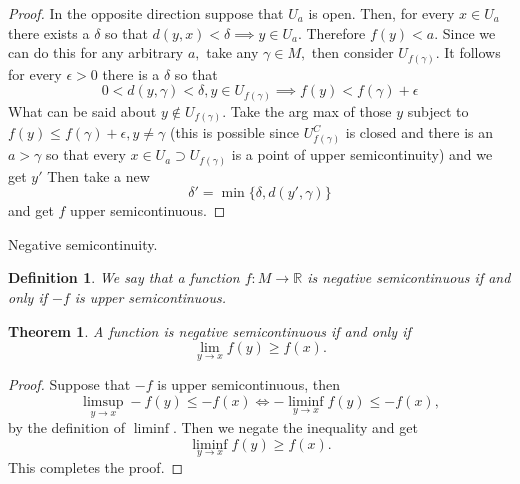 \documentclass[letter]{article}
\newtheorem{theorem}{Theorem}
\newtheorem{definition}{Definition}
\newenvironment{menumerate}{%
  \edef\backupindent{\the\parindent}%
  \enumerate%
  \setlength{\parindent}{\backupindent}%
}{\endenumerate}
\begin{document}
\begin{menumerate}
\begin{menumerate}
\begin{proof}
         In the opposite direction suppose that $U_a$ is open.
         Then, for every $x \in U_a$ there exists a $\delta$ so that
         $d(y,x) < \delta \implies y \in U_a. $ Therefore $f(y) < a.$
         Since we can do this for any arbitrary $a,$ take any $\gamma \in M,$ then consider $U_{f(\gamma)}.$ It follows for every $\epsilon > 0$ there is a $\delta$ so that
         \begin{equation}
            0 < d(y, \gamma) < \delta, y \in U_{f(\gamma)} \implies f(y) < f(\gamma) + \epsilon
         \end{equation}
         What can be said about $y \notin U_{f(\gamma)}.$ Take the arg max of
         those $y$ subject to $f(y) \leq f(\gamma)  + \epsilon, y \neq \gamma$ (this is possible since $U_{f(\gamma)}^C$ is closed and there is an $a > \gamma$ so that every $x \in U_a \supset U_{f(\gamma)}$ is a point of upper semicontinuity) and we get $y'$ Then take a new 
         \begin{equation}
            \delta' = \min\{\delta, d(y',\gamma)\}
         \end{equation}
         and get $f$ upper semicontinuous.
    \end{proof}
    \item Negative semicontinuity.
    \begin{definition}
        We say that a function $f: M \to \mathbb{R}$ is negative semicontinuous if and only if $-f$ is upper semicontinuous.   
    \end{definition}
    \begin{theorem}
        A function is negative semicontinuous if and only if 
        \begin{equation}
            \lim_{y \to x} f(y) \geq f(x).    
        \end{equation}   
    \end{theorem}
    \begin{proof}
        Suppose that $-f$ is upper semicontinuous, then
        \begin{equation}
            \limsup_{y \to x} -f(y) \leq -f(x) \iff
            -\liminf_{y \to x} f(y) \leq -f(x),   
        \end{equation}   
        by the definition of $\liminf.$ Then we negate the inequality and get 
        \begin{equation}
            \liminf_{y\to x} f(y) \geq f(x).
        \end{equation}
        This completes the proof.
    \end{proof}
     \end{menumerate} 
     \item
     \item 


\end{menumerate}
\end{document}
